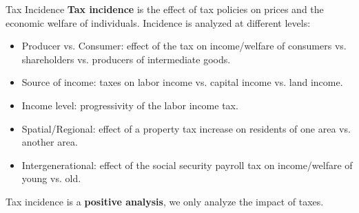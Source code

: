 \documentclass[8pt]{extarticle}
\begin{document}
  \begin{problem}{Tax Incidence}
    \textbf{Tax incidence} is the effect of tax policies on prices and the economic welfare of individuals. Incidence is analyzed at different levels:
    \begin{itemize}
      \item Producer vs. Consumer: effect of the tax on income/welfare of consumers vs. shareholders vs. producers of intermediate goods.
      \item Source of income: taxes on labor income vs. capital income vs. land income.
      \item Income level: progressivity of the labor income tax.
      \item Spatial/Regional: effect of a property tax increase on residents of one area vs. another area.
      \item Intergenerational: effect of the social security payroll tax on income/welfare of young vs. old.
    \end{itemize}
    Tax incidence is a \textbf{positive analysis}, we only analyze the impact of taxes.
  \end{problem}
\end{document}
